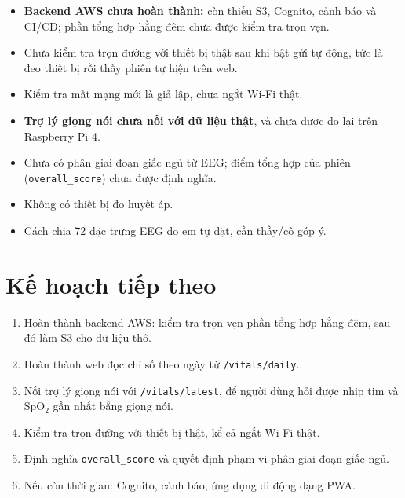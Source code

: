 \documentclass[12pt,a4paper]{article}
\newcommand{\spo}{SpO$_2$}
\newcommand{\code}[1]{\texttt{#1}}
\begin{document}
\begin{itemize}
  \item \textbf{Backend AWS chưa hoàn thành:} còn thiếu S3, Cognito, cảnh báo và CI/CD; phần tổng hợp hằng đêm chưa được kiểm tra trọn vẹn.
  \item Chưa kiểm tra trọn đường với thiết bị thật sau khi bật gửi tự động, tức là đeo thiết bị rồi thấy phiên tự hiện trên web.
  \item Kiểm tra mất mạng mới là giả lập, chưa ngắt Wi-Fi thật.
  \item \textbf{Trợ lý giọng nói chưa nối với dữ liệu thật}, và chưa được đo lại trên Raspberry Pi 4.
  \item Chưa có phân giai đoạn giấc ngủ từ EEG; điểm tổng hợp của phiên (\code{overall\_score}) chưa được định nghĩa.
  \item Không có thiết bị đo huyết áp.
  \item Cách chia 72 đặc trưng EEG do em tự đặt, cần thầy/cô góp ý.
\end{itemize}

\section{Kế hoạch tiếp theo}

\begin{enumerate}
  \item Hoàn thành backend AWS: kiểm tra trọn vẹn phần tổng hợp hằng đêm, sau đó làm S3 cho dữ liệu thô.
  \item Hoàn thành web đọc chỉ số theo ngày từ \code{/vitals/daily}.
  \item Nối trợ lý giọng nói với \code{/vitals/latest}, để người dùng hỏi được nhịp tim và \spo{} gần nhất bằng giọng nói.
  \item Kiểm tra trọn đường với thiết bị thật, kể cả ngắt Wi-Fi thật.
  \item Định nghĩa \code{overall\_score} và quyết định phạm vi phân giai đoạn giấc ngủ.
  \item Nếu còn thời gian: Cognito, cảnh báo, ứng dụng di động dạng PWA.
\end{enumerate}
\end{document}
